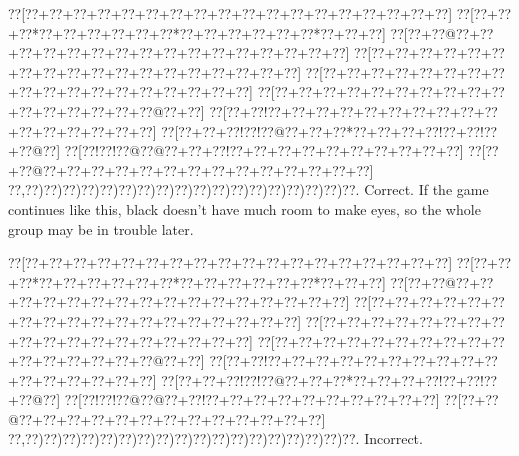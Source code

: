 \documentclass[a5paper]{article}
\begin{document}
\begin{center}
{\goo
\0??[\0??+\0??+\0??+\0??+\0??+\0??+\0??+\0??+\0??+\0??+\0??+\0??+\0??+\0??+\0??+\0??+\0??+\0??]
\0??[\0??+\0??+\0??*\0??+\0??+\0??+\0??+\0??+\0??*\0??+\0??+\0??+\0??+\0??+\0??*\0??+\0??+\0??]
\0??[\0??+\0??@\0??+\0??+\0??+\0??+\0??+\0??+\0??+\0??+\0??+\0??+\0??+\0??+\0??+\0??+\0??+\0??]
\0??[\0??+\0??+\0??+\0??+\0??+\0??+\0??+\0??+\0??+\0??+\0??+\0??+\0??+\0??+\0??+\0??+\0??+\0??]
\0??[\0??+\0??+\0??+\0??+\0??+\0??+\0??+\0??+\0??+\0??+\0??+\0??+\0??+\0??+\0??+\0??+\0??+\0??]
\0??[\0??+\0??+\0??+\0??+\0??+\0??+\0??+\0??+\0??+\0??+\0??+\0??+\0??+\0??+\0??+\0??@\0??+\0??]
\0??[\0??+\0??!\0??+\0??+\0??+\0??+\0??+\0??+\0??+\0??+\0??+\0??+\0??+\0??+\0??+\0??+\0??+\0??]
\0??[\0??+\0??+\0??!\0??!\0??@\0??+\0??+\0??*\0??+\0??+\0??+\0??!\0??+\0??!\0??+\0??@\0??]
\0??[\0??!\0??!\0??@\0??@\0??+\0??+\0??!\0??+\0??+\0??+\0??+\0??+\0??+\0??+\0??+\0??+\0??]
\0??[\0??+\0??@\0??+\0??+\0??+\0??+\0??+\0??+\0??+\0??+\0??+\0??+\0??+\0??+\0??+\0??]
\0??,\0??)\0??)\0??)\0??)\0??)\0??)\0??)\0??)\0??)\0??)\0??)\0??)\0??)\0??)\0??)\0??)\0??)\0??.
}
Correct. If the game continues like this, black doesn't have much room to make eyes, so the whole group may be in trouble later.

\end{center}
\begin{center}
{\goo
\0??[\0??+\0??+\0??+\0??+\0??+\0??+\0??+\0??+\0??+\0??+\0??+\0??+\0??+\0??+\0??+\0??+\0??+\0??]
\0??[\0??+\0??+\0??*\0??+\0??+\0??+\0??+\0??+\0??*\0??+\0??+\0??+\0??+\0??+\0??*\0??+\0??+\0??]
\0??[\0??+\0??@\0??+\0??+\0??+\0??+\0??+\0??+\0??+\0??+\0??+\0??+\0??+\0??+\0??+\0??+\0??+\0??]
\0??[\0??+\0??+\0??+\0??+\0??+\0??+\0??+\0??+\0??+\0??+\0??+\0??+\0??+\0??+\0??+\0??+\0??+\0??]
\0??[\0??+\0??+\0??+\0??+\0??+\0??+\0??+\0??+\0??+\0??+\0??+\0??+\0??+\0??+\0??+\0??+\0??+\0??]
\0??[\0??+\0??+\0??+\0??+\0??+\0??+\0??+\0??+\0??+\0??+\0??+\0??+\0??+\0??+\0??+\0??@\0??+\0??]
\0??[\0??+\0??!\0??+\0??+\0??+\0??+\0??+\0??+\0??+\0??+\0??+\0??+\0??+\0??+\0??+\0??+\0??+\0??]
\0??[\0??+\0??+\0??!\0??!\0??@\0??+\0??+\0??*\0??+\0??+\0??+\0??!\0??+\0??!\0??+\0??@\0??]
\0??[\0??!\0??!\0??@\0??@\0??+\0??!\0??+\0??+\0??+\0??+\0??+\0??+\0??+\0??+\0??+\0??]
\0??[\0??+\0??@\0??+\0??+\0??+\0??+\0??+\0??+\0??+\0??+\0??+\0??+\0??+\0??+\0??]
\0??,\0??)\0??)\0??)\0??)\0??)\0??)\0??)\0??)\0??)\0??)\0??)\0??)\0??)\0??)\0??)\0??)\0??)\0??.
}
Incorrect. 

\end{center}
\end{document}
